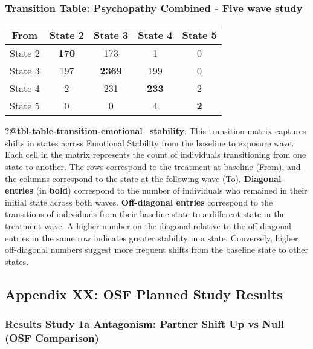 \documentclass[
  singlecolumn]{article}
\begin{document}
\subsubsection{Transition Table: Psychopathy Combined - Five wave
study}\label{transition-table-psychopathy-combined---five-wave-study}

\begin{longtable}[]{@{}ccccc@{}}
\toprule\noalign{}
From & State 2 & State 3 & State 4 & State 5 \\
\midrule\noalign{}
\endhead
\bottomrule\noalign{}
\endlastfoot
State 2 & \textbf{170} & 173 & 1 & 0 \\
State 3 & 197 & \textbf{2369} & 199 & 0 \\
State 4 & 2 & 231 & \textbf{233} & 2 \\
State 5 & 0 & 0 & 4 & \textbf{2} \\
\end{longtable}

\textbf{?@tbl-table-transition-emotional\_stability}: This transition
matrix captures shifts in states across Emotional Stability from the
baseline to exposure wave. Each cell in the matrix represents the count
of individuals transitioning from one state to another. The rows
correspond to the treatment at baseline (From), and the columns
correspond to the state at the following wave (To). \textbf{Diagonal
entries} (in \textbf{bold}) correspond to the number of individuals who
remained in their initial state across both waves. \textbf{Off-diagonal
entries} correspond to the transitions of individuals from their
baseline state to a different state in the treatment wave. A higher
number on the diagonal relative to the off-diagonal entries in the same
row indicates greater stability in a state. Conversely, higher
off-diagonal numbers suggest more frequent shifts from the baseline
state to other states.

\newpage{}

\subsection{Appendix XX: OSF Planned Study Results}\label{appendix-xx}

\subsubsection{Results Study 1a Antagonism: Partner Shift Up vs Null
(OSF
Comparison)}\label{results-study-1a-antagonism-partner-shift-up-vs-null-osf-comparison}
\end{document}

